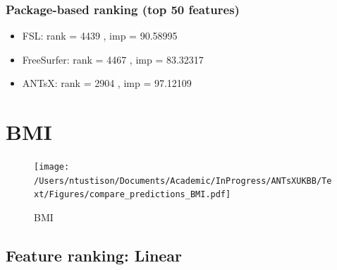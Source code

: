 \documentclass[
  10pt,
]{article}
\begin{document}
\hypertarget{package-based-ranking-top-50-features-3}{%
\subsubsection{Package-based ranking (top 50
features)}\label{package-based-ranking-top-50-features-3}}

\begin{itemize}
\item
  FSL: rank = 4439 , imp = 90.58995
\item
  FreeSurfer: rank = 4467 , imp = 83.32317
\item
  ANTsX: rank = 2904 , imp = 97.12109
\end{itemize}

\clearpage

\hypertarget{bmi}{%
\section{BMI}\label{bmi}}

\begin{figure}
\centering
\texttt{[image: /Users/ntustison/Documents/Academic/InProgress/ANTsXUKBB/Text/Figures/compare\_predictions\_BMI.pdf]}
\caption{BMI}
\end{figure}

\hypertarget{feature-ranking-linear-4}{%
\subsection{Feature ranking: Linear}\label{feature-ranking-linear-4}}
\end{document}
